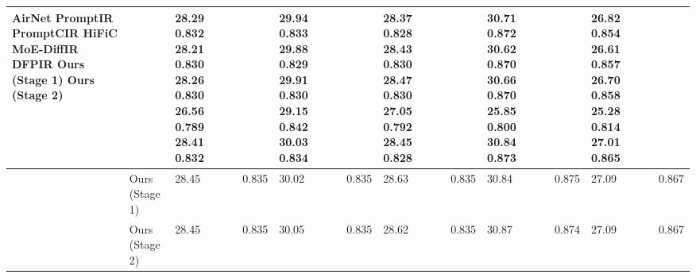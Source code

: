 \begin{tabular}{llllllllllll}
\toprule
AirNet PromptIR PromptCIR HiFiC MoE-DiffIR DFPIR Ours (Stage 1) Ours (Stage 2) &  & 28.29 0.832 28.21 0.830 28.26 0.830 26.56 0.789 28.41 0.832 &  & 29.94 0.833 29.88 0.829 29.91 0.830 29.15 0.842 30.03 0.834 &  & 28.37 0.828 28.43 0.830 28.47 0.830 27.05 0.792 28.45 0.828 &  & 30.71 0.872 30.62 0.870 30.66 0.870 25.85 0.800 30.84 0.873 &  & 26.82 0.854 26.61 0.857 26.70 0.858 25.28 0.814 27.01 0.865 &  \\
\midrule
 & Ours (Stage 1) & 28.45 & 0.835 & 30.02 & 0.835 & 28.63 & 0.835 & 30.84 & 0.875 & 27.09 & 0.867 \\
 & Ours (Stage 2) & 28.45 & 0.835 & 30.05 & 0.835 & 28.62 & 0.835 & 30.87 & 0.874 & 27.09 & 0.867 \\
\bottomrule
\end{tabular}
